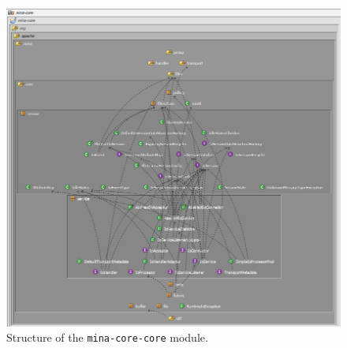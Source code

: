 \begin{figure}[H]
    \centering
    \includegraphics[scale = 0.7]{images/MINA_core_core_initial.png}
    \caption{Structure of the \texttt{mina-core-core} module.}
    \label{fig:mina_core_core_initial}
\end{figure}

